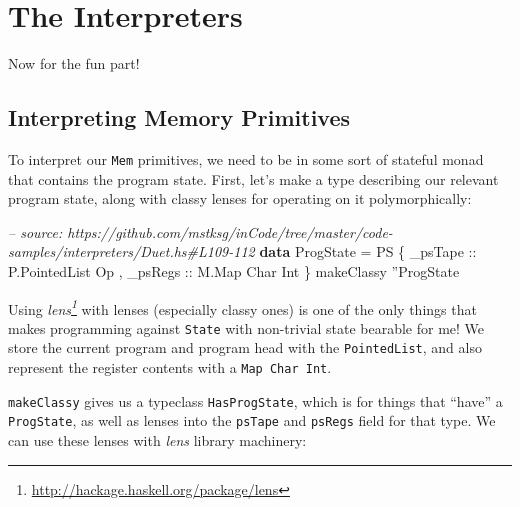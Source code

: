 \documentclass[]{article}
\newenvironment{Shaded}{}{}
\newcommand{\KeywordTok}[1]{\textcolor[rgb]{0.00,0.44,0.13}{\textbf{#1}}}
\newcommand{\DataTypeTok}[1]{\textcolor[rgb]{0.56,0.13,0.00}{#1}}
\newcommand{\CharTok}[1]{\textcolor[rgb]{0.25,0.44,0.63}{#1}}
\newcommand{\CommentTok}[1]{\textcolor[rgb]{0.38,0.63,0.69}{\textit{#1}}}
\newcommand{\OtherTok}[1]{\textcolor[rgb]{0.00,0.44,0.13}{#1}}
\newcommand{\FunctionTok}[1]{\textcolor[rgb]{0.02,0.16,0.49}{#1}}
\newcommand{\NormalTok}[1]{#1}
\renewcommand{\href}[2]{#2\footnote{\url{#1}}}
\begin{document}
\section{The Interpreters}\label{the-interpreters}

Now for the fun part!

\subsection{Interpreting Memory
Primitives}\label{interpreting-memory-primitives}

To interpret our \texttt{Mem} primitives, we need to be in some sort of stateful
monad that contains the program state. First, let's make a type describing our
relevant program state, along with classy lenses for operating on it
polymorphically:

\begin{Shaded}
\begin{Highlighting}[]
\CommentTok{-- source: https://github.com/mstksg/inCode/tree/master/code-samples/interpreters/Duet.hs#L109-112}
\KeywordTok{data} \DataTypeTok{ProgState} \FunctionTok{=} \DataTypeTok{PS}\NormalTok{ \{}\OtherTok{ _psTape ::} \DataTypeTok{P.PointedList} \DataTypeTok{Op}
\NormalTok{                    ,}\OtherTok{ _psRegs ::} \DataTypeTok{M.Map} \DataTypeTok{Char} \DataTypeTok{Int}
\NormalTok{                    \}}
\NormalTok{makeClassy }\CharTok{''}\DataTypeTok{ProgState}
\end{Highlighting}
\end{Shaded}

Using \emph{\href{http://hackage.haskell.org/package/lens}{lens}} with lenses
(especially classy ones) is one of the only things that makes programming
against \texttt{State} with non-trivial state bearable for me! We store the
current program and program head with the \texttt{PointedList}, and also
represent the register contents with a \texttt{Map\ Char\ Int}.

\texttt{makeClassy} gives us a typeclass \texttt{HasProgState}, which is for
things that ``have'' a \texttt{ProgState}, as well as lenses into the
\texttt{psTape} and \texttt{psRegs} field for that type. We can use these lenses
with \emph{lens} library machinery:
\end{document}
